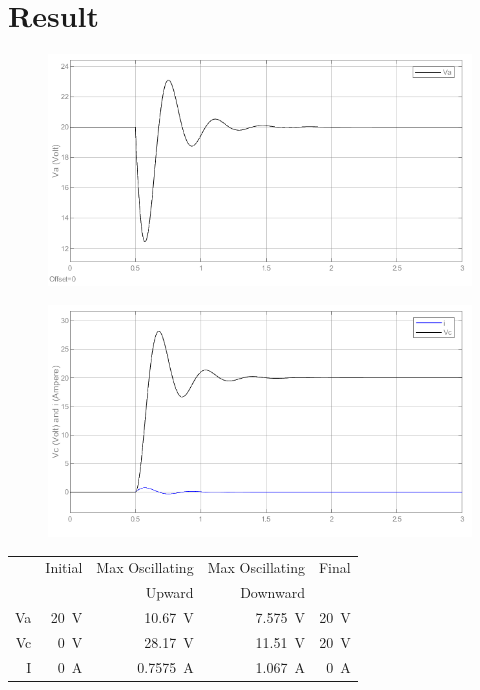 \documentclass{article}
\begin{document}
\section*{Result}
\begin{figure}[H]
    \centering
        \includegraphics[scale=0.65]{1_Va.png}
\end{figure}
\begin{figure}[H]
    \centering
        \includegraphics[scale=0.65]{1_Vc_i.png}
\end{figure}
\begin{table}[H]
    \centering
    \begin{tabular}{rrrrr}
        \toprule
        &Initial & Max Oscillating & Max Oscillating & Final\\
        && Upward&  Downward & \\
        \midrule
        Va & \SI{20}{\volt} & \SI{10.67}{\volt} & \SI{7.575}{\volt} & \SI{20}{\volt} \\
        Vc & \SI{0}{\volt} & \SI{28.17}{\volt} & \SI{11.51}{\volt} & \SI{20}{\volt} \\
        I & \SI{0}{\ampere} & \SI{0.7575}{\ampere} & \SI{1.067}{\ampere} & \SI{0}{\ampere} \\
        \bottomrule
    \end{tabular} 
\end{table}
\end{document}
